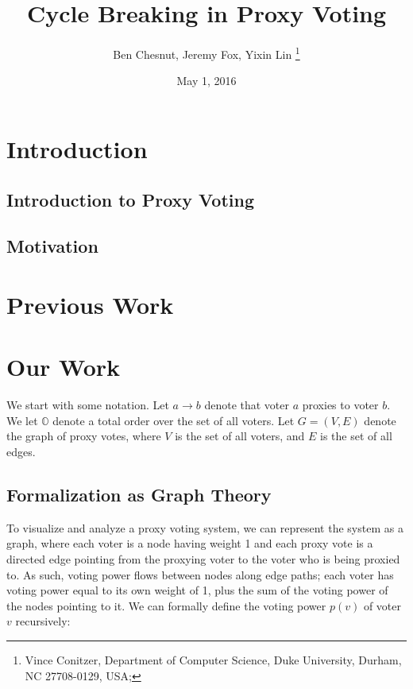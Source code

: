 \documentclass[10pt]{article}
\theoremstyle{definition}
\newcommand{\bb}[1]{\mathbb{#1}}
\begin{document}
  
\title{Cycle Breaking in Proxy Voting
}
\date{May 1, 2016}

\author{
Ben Chesnut, Jeremy Fox, Yixin Lin \thanks{%
Vince Conitzer, Department of Computer Science, Duke University, Durham, NC
27708-0129, USA;}}

\maketitle

\section{Introduction}

\subsection{Introduction to Proxy Voting}

\subsection{Motivation}

\section{Previous Work}


\section{Our Work}

We start with some notation. Let $a \rightarrow b$ denote that voter $a$ proxies to voter $b$. We let $\bb{O}$ denote a total order over the set of all voters. Let $G = (V,E)$ denote the graph of proxy votes, where $V$ is the set of all voters, and $E$ is the set of all edges.

\subsection{Formalization as Graph Theory}
To visualize and analyze a proxy voting system, we can represent the system as a graph, where each voter is a node having weight 1 and each proxy vote is a directed edge pointing from the proxying voter to the voter who is being proxied to. As such, voting power flows between nodes along edge paths; each voter has voting power equal to its own weight of 1, plus the sum of the voting power of the nodes pointing to it. We can formally define the voting power $p(v)$ of voter $v$ recursively:
\end{document}

